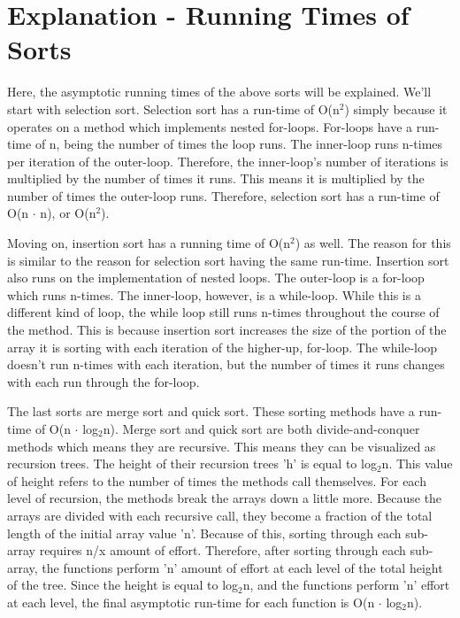 \documentclass[letterpaper, 10pt]{article}
\begin{document}
\section{Explanation - Running Times of Sorts}\par
Here, the asymptotic running times of the above sorts will be explained. We'll start with selection sort. Selection sort has a run-time of O(n$^{2}$) simply because it operates on a method which implements nested for-loops. For-loops have a run-time of n, being the number of times the loop runs. The inner-loop runs n-times per iteration of the outer-loop. Therefore, the inner-loop's number of iterations is multiplied by the number of times it runs. This means it is multiplied by the number of times the outer-loop runs. Therefore, selection sort has a run-time of O(n $\cdot$ n), or O(n$^{2}$).\par
Moving on, insertion sort has a running time of O(n$^{2}$) as well. The reason for this is similar to the reason for selection sort having the same run-time. Insertion sort also runs on the implementation of nested loops. The outer-loop is a for-loop which runs n-times. The inner-loop, however, is a while-loop. While this is a different kind of loop, the while loop still runs n-times throughout the course of the method. This is because insertion sort increases the size of the portion of the array it is sorting with each iteration of the higher-up, for-loop. The while-loop doesn't run n-times with each iteration, but the number of times it runs changes with each run through the for-loop.\par
The last sorts are merge sort and quick sort. These sorting methods have a run-time of O(n $\cdot$ log$_{2}$n). Merge sort and quick sort are both divide-and-conquer methods which means they are recursive. This means they can be visualized as recursion trees. The height of their recursion trees 'h' is equal to log$_{2}$n. This value of height refers to the number of times the methods call themselves. For each level of recursion, the methods break the arrays down a little more. Because the arrays are divided with each recursive call, they become a fraction of the total length of the initial array value 'n'. Because of this, sorting through each sub-array requires n/x amount of effort. Therefore, after sorting through each sub-array, the functions perform 'n' amount of effort at each level of the total height of the tree. Since the height is equal to log$_{2}$n, and the functions perform 'n' effort at each level, the final asymptotic run-time for each function is O(n $\cdot$ log$_{2}$n).\par
\end{document}
